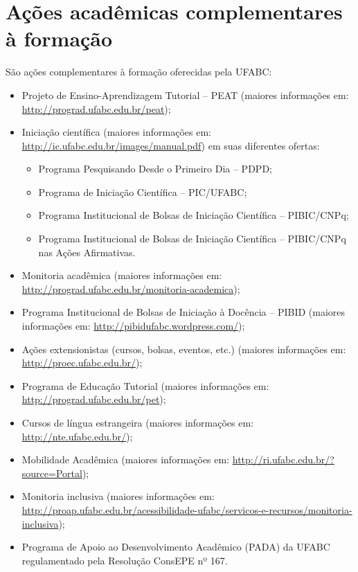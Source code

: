 \section{Ações acadêmicas complementares à formação}

São ações complementares à formação oferecidas pela UFABC:
\begin{itemize}
    \item Projeto de Ensino-Aprendizagem Tutorial -- PEAT (maiores informações
    em: \url{http://prograd.ufabc.edu.br/peat});

    \item Iniciação científica (maiores informações em:
    \url{http://ic.ufabc.edu.br/images/manual.pdf}) em suas diferentes ofertas: 
    \begin{itemize}
        \item Programa Pesquisando Desde o Primeiro Dia -- PDPD;
        \item Programa de Iniciação Científica -- PIC/UFABC;
        \item Programa Institucional de Bolsas de Iniciação Científica -- PIBIC/CNPq;
        \item Programa Institucional de Bolsas de Iniciação Científica -- PIBIC/CNPq nas Ações Afirmativas.
    \end{itemize}

    \item Monitoria acadêmica (maiores informações em:
    \url{http://prograd.ufabc.edu.br/monitoria-academica});

    \item Programa Institucional de Bolsas de Iniciação à Docência -- PIBID
    (maiores informações em: \url{http://pibidufabc.wordpress.com/});

    \item Ações extensionistas (cursos, bolsas, eventos, etc.) (maiores
    informações em: \url{http://proec.ufabc.edu.br/});

    \item Programa de Educação Tutorial (maiores informações em:
    \url{http://prograd.ufabc.edu.br/pet});

    \item Cursos de língua estrangeira (maiores informações em:
    \url{http://nte.ufabc.edu.br/});

    \item Mobilidade Acadêmica (maiores informações em:
    \url{http://ri.ufabc.edu.br/?source=Portal});

    \item Monitoria inclusiva (maiores informações em:
    \url{http://proap.ufabc.edu.br/acessibilidade-ufabc/servicos-e-recursos/monitoria-inclusiva});

    \item Programa de Apoio ao Desenvolvimento Acadêmico (PADA) da UFABC
    regulamentado pela Resolução ConsEPE nº 167.
\end{itemize}
